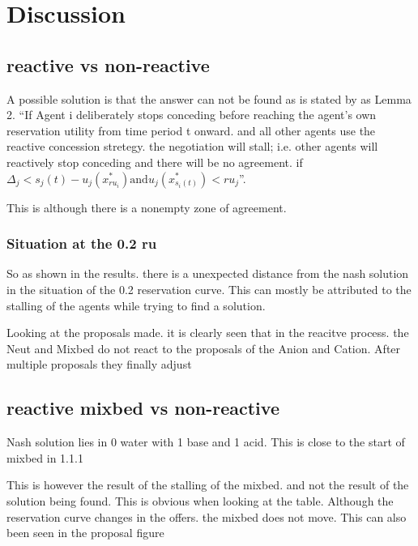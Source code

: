\section{Discussion}
\subsection{reactive vs non-reactive}
A possible solution is that the answer can not be found as is stated by \citet{zheng2015automated} as Lemma 2. ``If Agent i deliberately stops conceding before reaching the agent's own reservation utility from time period t onward. and all other agents use the reactive concession stretegy. the negotiation will stall; i.e. other agents will reactively stop conceding and there will be no agreement. if $\Delta_j < s_j(t)-u_j(x^*_{ru_i}) \text{and} u_j(x^*_{s_i(t)})<ru_j$''.

This is although there is a nonempty zone of agreement.

\subsubsection{Situation at the 0.2 ru}
So as shown in the results. there is a unexpected distance from the nash solution in the situation of the 0.2 reservation curve. This can mostly be attributed to the stalling of the agents while trying to find a solution.

Looking at the proposals made. it is clearly seen that in the reacitve process. the Neut and Mixbed do not react to the proposals of the Anion and Cation. After multiple proposals they finally adjust 


\subsection{reactive mixbed vs non-reactive}
Nash solution lies in 0 water with 1 base and 1 acid. This is close to the start of mixbed in 1.1.1

This is however the result of the stalling of the mixbed. and not the result of the solution being found. This is obvious when looking at the table. Although the reservation curve changes in the offers. the mixbed does not move. This can also been seen in the proposal figure



